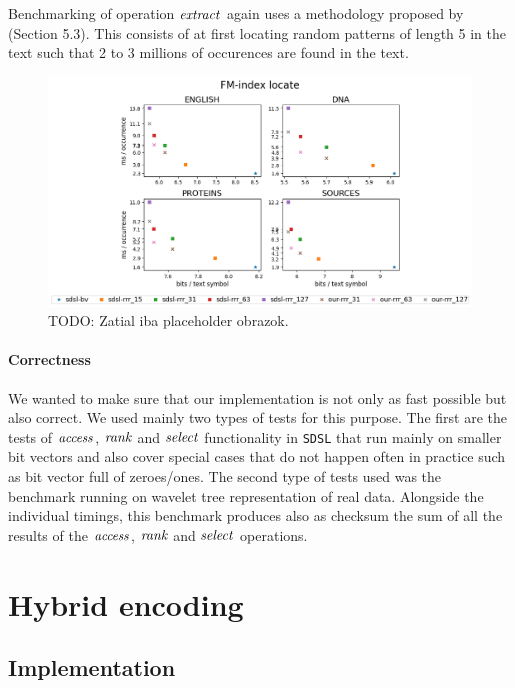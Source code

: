 Benchmarking of operation $\mathit{extract}$ again uses a methodology proposed by \cite{ferragina2009compressed} 
(Section 5.3). This consists of at first locating random patterns of length 5 in the text such
that 2 to 3 millions of occurences are found in the text.

\begin{figure}
	\centerline{
		\includegraphics[width=\textwidth, height=0.35\textheight]{images/vysledky_sdsl_locate}
	}
	\caption[TODO]{TODO: Zatial iba placeholder obrazok.
	}
	\label{obr:benchmark_sdsl_locate}
\end{figure}

\paragraph{Correctness}

We wanted to make sure that our implementation is not only as fast possible but also correct. We
used mainly two types of tests for this purpose. The first are the tests of $\mathit{access}$, $\mathit{rank}$
and $\mathit{select}$ functionality in \texttt{SDSL} that run mainly on smaller bit vectors and also cover
special cases that do not happen often in practice such as bit vector full of zeroes/ones. The
second type of tests used was the benchmark running on wavelet tree representation of real data.
Alongside the individual timings, this benchmark produces also as checksum the sum of all the
results of the $\mathit{access}$, $\mathit{rank}$ and $\mathit{select}$ operations.

\section{Hybrid encoding}


\subsection{Implementation}

